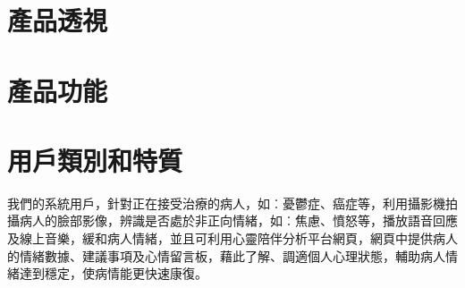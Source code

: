 \documentclass[12pt]{scrreprt}
\begin{document}
\section{產品透視} %

\section{產品功能} %

\section{用戶類別和特質}
我們的系統用戶，針對正在接受治療的病人，如︰憂鬱症、癌症等，利用攝影機拍攝病人的臉部影像，辨識是否處於非正向情緒，如︰焦慮、憤怒等，播放語音回應及線上音樂，緩和病人情緒，並且可利用心靈陪伴分析平台網頁，網頁中提供病人的情緒數據、建議事項及心情留言板，藉此了解、調適個人心理狀態，輔助病人情緒達到穩定，使病情能更快速康復。
\end{document}
